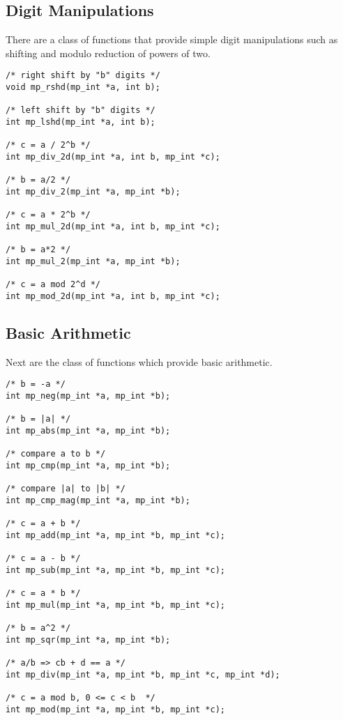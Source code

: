 \documentclass{article}
\begin{document}
\subsection{Digit Manipulations}

There are a class of functions that provide simple digit manipulations such as shifting and modulo reduction of powers
of two.  

\begin{verbatim}
/* right shift by "b" digits */
void mp_rshd(mp_int *a, int b);

/* left shift by "b" digits */
int mp_lshd(mp_int *a, int b);

/* c = a / 2^b */
int mp_div_2d(mp_int *a, int b, mp_int *c);

/* b = a/2 */
int mp_div_2(mp_int *a, mp_int *b);

/* c = a * 2^b */
int mp_mul_2d(mp_int *a, int b, mp_int *c);

/* b = a*2 */
int mp_mul_2(mp_int *a, mp_int *b);

/* c = a mod 2^d */
int mp_mod_2d(mp_int *a, int b, mp_int *c);
\end{verbatim}

\subsection{Basic Arithmetic}

Next are the class of functions which provide basic arithmetic.

\begin{verbatim}
/* b = -a */
int mp_neg(mp_int *a, mp_int *b);

/* b = |a| */
int mp_abs(mp_int *a, mp_int *b);

/* compare a to b */
int mp_cmp(mp_int *a, mp_int *b);

/* compare |a| to |b| */
int mp_cmp_mag(mp_int *a, mp_int *b);

/* c = a + b */
int mp_add(mp_int *a, mp_int *b, mp_int *c);

/* c = a - b */
int mp_sub(mp_int *a, mp_int *b, mp_int *c);

/* c = a * b */
int mp_mul(mp_int *a, mp_int *b, mp_int *c);

/* b = a^2 */
int mp_sqr(mp_int *a, mp_int *b);

/* a/b => cb + d == a */
int mp_div(mp_int *a, mp_int *b, mp_int *c, mp_int *d);

/* c = a mod b, 0 <= c < b  */
int mp_mod(mp_int *a, mp_int *b, mp_int *c);
\end{verbatim}
\end{document}
